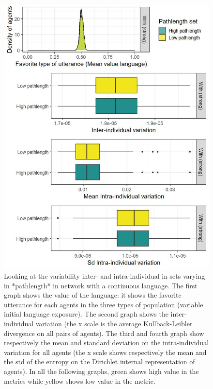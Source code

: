 \documentclass[
]{article}
\begin{document}
\begin{figure}[!H]

{\centering \includegraphics{./Figures/unnamed-chunk-66-1} 

}

\caption{Looking at the variability inter- and intra-individual in sets varying in *pathlength* in network with a continuous language. The first graph shows the value of the language: it shows the favorite utterance for each agents in the three types of population (variable initial language exposure). The second graph shows the  inter-individual variation (the x scale is the average Kullback-Leibler divergence on all pairs of agents). The third and fourth graph show respectively the mean and standard deviation on the intra-individual variation for all agents (the x scale shows respectively the mean and the std of the entropy on the Dirichlet internal representation of agents). In all the following graphs, green shows high value in the metrics while yellow shows low value in the metric.}\label{fig:unnamed-chunk-66}
\end{figure}
\end{document}
